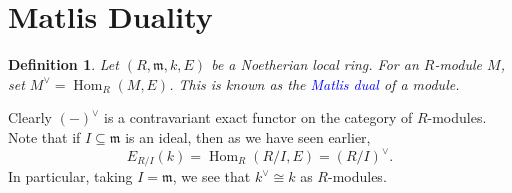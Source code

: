 \documentclass[10pt]{article}
\theoremstyle{thmstyle}
\theoremstyle{defstyle}
\newtheorem{definition}[theorem]{Definition}
\newcommand{\Hom}{\operatorname{Hom}}
\newcommand{\frakm}{\mathfrak{m}} %
\newcommand{\define}[1]{\textcolor{blue}{\textit{#1}}}
\begin{document}
\section{Matlis Duality}

\begin{definition}
    Let $(R,\frakm, k, E)$ be a Noetherian local ring. For an $R$-module $M$, set $M^\vee = \Hom_R(M, E)$. This is known as the \define{Matlis dual} of a module.
\end{definition}

Clearly $(-)^\vee$ is a contravariant exact functor on the category of $R$-modules. Note that if $I\subseteq\frakm$ is an ideal, then as we have seen earlier, 
\begin{equation*}
    E_{R/I}(k) = \Hom_R\left(R/I, E\right) = \left(R/I\right)^\vee.
\end{equation*}
In particular, taking $I = \frakm$, we see that $k^\vee \cong k$ as $R$-modules.
\end{document}

